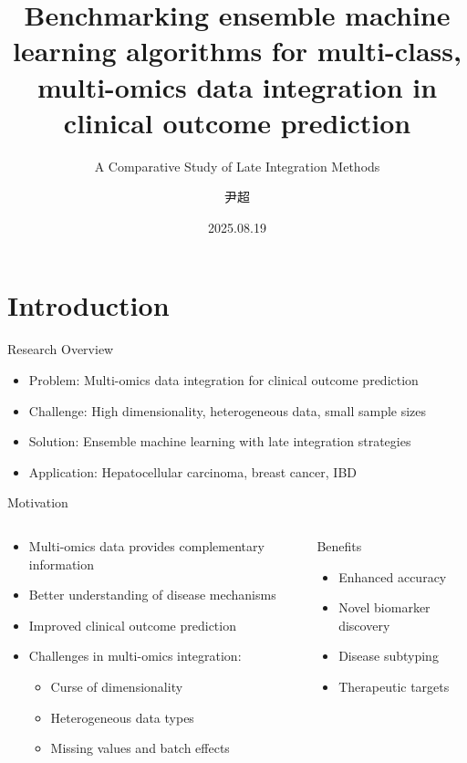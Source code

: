 \documentclass{beamer}
\title{Benchmarking ensemble machine learning algorithms for multi-class, multi-omics data integration in clinical outcome prediction}
\subtitle{A Comparative Study of Late Integration Methods}
\author{尹超}
\date{2025.08.19}
\begin{document}
\maketitle
\addtocounter{framenumber}{-1}

\section{Introduction}

\begin{frame}{Research Overview}
\begin{itemize}
\item \alert{Problem}: Multi-omics data integration for clinical outcome prediction
\item \alert{Challenge}: High dimensionality, heterogeneous data, small sample sizes
\item \alert{Solution}: Ensemble machine learning with late integration strategies
\item \alert{Application}: Hepatocellular carcinoma, breast cancer, IBD
\end{itemize}
\end{frame}

\begin{frame}{Motivation}
\begin{columns}
\begin{column}{0.6\textwidth}
\begin{itemize}
\item Multi-omics data provides \alert{complementary information}
\item Better understanding of disease mechanisms
\item Improved clinical outcome prediction
\item Challenges in multi-omics integration:
  \begin{itemize}
  \item Curse of dimensionality
  \item Heterogeneous data types
  \item Missing values and batch effects
  \end{itemize}
\end{itemize}
\end{column}
\begin{column}{0.4\textwidth}
\begin{block}{Benefits}
\begin{itemize}
\item Enhanced accuracy
\item Novel biomarker discovery
\item Disease subtyping
\item Therapeutic targets
\end{itemize}
\end{block}
\end{column}
\end{columns}
\end{frame}
\end{document}
